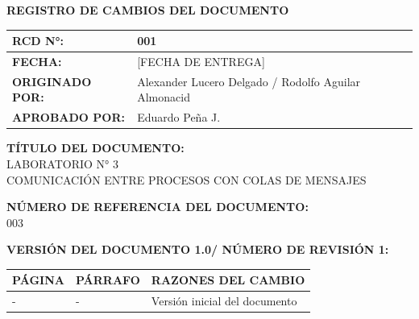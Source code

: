 \documentclass[10pt]{article}
\newcommand{\docente}{Eduardo Peña J.}
\newcommand{\estudiante}{Alexander Lucero Delgado / Rodolfo Aguilar Almonacid}
\newcommand{\fechaentrega}{[FECHA DE ENTREGA]}
\begin{document}
\begin{center}
  \textbf{REGISTRO DE CAMBIOS DEL DOCUMENTO} \\
  \vspace{0.3cm}
  \begin{tabular}{|l|l|}
    \hline
    \textbf{RCD N°:} & 001 \\
    \hline
    \textbf{FECHA:} & \fechaentrega \\
    \hline
    \textbf{ORIGINADO POR:} & \estudiante \\
    \hline
    \textbf{APROBADO POR:} & \docente \\
    \hline
  \end{tabular}
  
  \vspace{1cm}
  
  \textbf{TÍTULO DEL DOCUMENTO:} \\
  LABORATORIO N° 3 \\
  COMUNICACIÓN ENTRE PROCESOS CON COLAS DE MENSAJES \\
  
  \vspace{0.5cm}
  
  \textbf{NÚMERO DE REFERENCIA DEL DOCUMENTO:} \\
  003 \\
  
  \vspace{0.5cm}
  
  \textbf{VERSIÓN DEL DOCUMENTO 1.0/ NÚMERO DE REVISIÓN 1:} \\
  
  \vspace{0.3cm}
  \begin{tabular}{|l|l|l|}
    \hline
    \textbf{PÁGINA} & \textbf{PÁRRAFO} & \textbf{RAZONES DEL CAMBIO} \\
    \hline
    - & - & Versión inicial del documento \\
    \hline
  \end{tabular}
\end{center}
\clearpage

\renewcommand{\thesection}{\Roman{section}}
\tableofcontents
\renewcommand{\thesection}{\arabic{section}}
\clearpage
\renewcommand{\thesection}{\Roman{section}}
\renewcommand{\thesubsection}{\Roman{section}.\arabic{subsection}}

\end{document}
